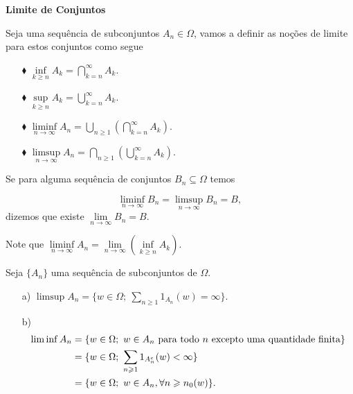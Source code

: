 \vspace*{1cm}
\textbf{Limite de Conjuntos}

Seja uma sequência de subconjuntos $A_n \in \Omega$, 
vamos a definir as noções de limite para estos conjuntos como segue
\begin{enumerate}
\item[$\blacklozenge$] $\inf \limits_{k\geqslant n} A_k = \displaystyle\bigcap_{k=n}^{\infty}{A_k}$.
\item[$\blacklozenge$] $\sup \limits_{k\geqslant n} A_k = \displaystyle\bigcup_{k=n}^{\infty}{A_k}$.
\item[$\blacklozenge$] 
	$\liminf \limits_{n \to \infty} A_n 
	= 
	\displaystyle\bigcup_ {n\geqslant 1} \left(\displaystyle\bigcap_{k=n}^{\infty}{A_k} \right)$.
\item[$\blacklozenge$] 
	$\limsup \limits_{n \to \infty} A_n 
	= 
	\displaystyle\bigcap_ {n\geqslant 1} \left(\displaystyle\bigcup_{k=n}^{\infty}{A_k} \right)$.
\end{enumerate}

\begin{definicao}
	Se para alguma sequência de conjuntos $B_n \subseteq \Omega$ temos

	$$
		\liminf \limits_{n \to \infty} B_n = \limsup \limits_{n \to \infty} B_n = B,
	$$	
	dizemos que existe $\lim \limits_{n \to \infty} B_n =B$.
\end{definicao}

Note que $\liminf \limits_{n\to \infty}A_n 
			=
			\lim \limits_{n\to \infty}\left(\inf \limits_{k\geqslant n}A_k \right)
		 $.


\begin{lema}
Seja $\{A_n\}$ uma sequência de subconjuntos de $\Omega$.
\begin{enumerate}
\item[a)] $\limsup A_n = \{ w \in \Omega;\ \sum_{n \geqslant 1} 1_{A_n}(w)= \infty \}$.
\item[b)] 
\begin{align*}
\vspace*{-2cm}
\liminf A_n & = \{ w \in \Omega;\ w \in A_n \text{ para todo $n$ excepto uma quantidade finita} \} \\
			& = \{w \in \Omega;\ \sum_{n\geqslant 1} 1_{A_n^c}(w) < \infty \} \\
			& = \{w \in \Omega;\ w \in A_n, \forall n \geqslant n_0(w) \}. 
\end{align*} 
\end{enumerate}
\end{lema}

